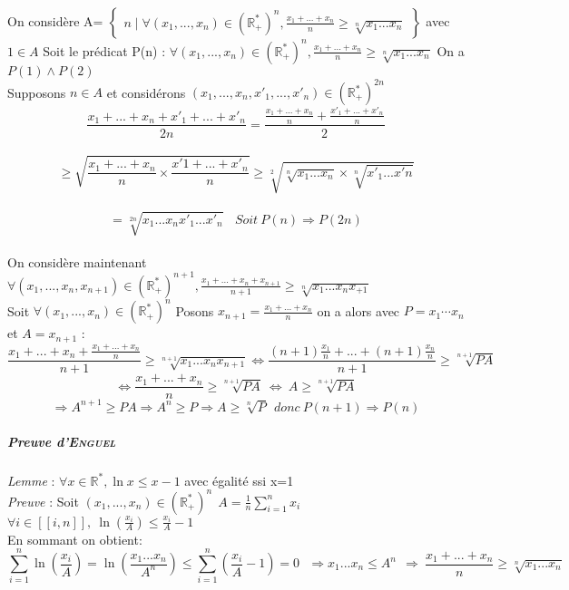 On considère A=
$\left\{
\begin{array}{l}
n\mid\forall (x_1,...,x_n)\in (\mathbb{R} _+^*)^n, \frac{x_1+...+x_n}{n}\geq\sqrt[n]{x_1...x_n}
\end{array}
\right\}$
 avec $1\in A$
Soit le prédicat P(n) : $\forall (x_1,...,x_n)\in (\mathbb{R} _+^*)^n, \frac{x_1+...+x_n}{n}\geq\sqrt[n]{x_1...x_n}$   On a $P(1)\wedge P(2)$
\\Supposons $n\in A$ et considérons $(x_1,...,x_n,x'_1,...,x'_n)\in (\mathbb{R} _+^*)^{2n}$
 \[\frac{x_1+...+x_n+x'_1+...+x'_n}{2n} =\frac{\frac{x_1+...+x_n}{n} + \frac{x'_1+...+x'_n}{n}}{2}\] \\\[\geq\sqrt{\frac{x_1+...+x_n}{n}\times\frac{x'1+...+x'_n}{n}}\geq\sqrt[2]{\sqrt[n]{x_1...x_n}\times\sqrt[n]{x'_1...x'n}}\] \\\[=\sqrt[2n]{x_1...x_nx'_1...x'_n} ~~~~Soit~P(n)\Rightarrow P(2n)\]
 \\On considère maintenant $\forall (x_1,...,x_n,x_{n+1})\in (\mathbb{R} _+^*)^{n+1}, \frac{x_1+...+x_n+x_{n+1}}{n+1}\geq\sqrt[n]{x_1...x_nx_{+1}}$
 \\Soit $\forall (x_1,...,x_n)\in (\mathbb{R} _+^*)^n$ Posons $x_{n+1}=\frac{x_1+...+x_n}{n}$ on a alors avec $P=x_1\cdots x_n$ et $A = x_{n+1}$ :
 \[\frac{x_1+...+x_n+\frac{x_1+...+x_n}{n}}{n+1}\geq\sqrt[n+1]{x_1...x_nx_{n+1}}
 \Leftrightarrow\frac{(n+1)\frac{x_1}{n} +...+(n+1)\frac{x_n}{n}}{n+1}\geq\sqrt[n+1]{PA}\]
 \[\Leftrightarrow\frac{x_1+...+x_n}{n}\geq\sqrt[n+1]{PA} ~\Leftrightarrow ~A\geq\sqrt[n+1]{PA}\]
 \[\Rightarrow A^{n+1}\geq PA \Rightarrow A^n\geq P\Rightarrow A\geq\sqrt[n]{P} ~~donc~P(n+1)\Rightarrow P(n)\]
 
\subparagraph{Preuve d'\textsc{Enguel}}
\textsl{Lemme} : $\forall x\in\mathbb{R} ^*, \ln x\leq x-1$ avec égalité ssi x=1
\\\textsl{Preuve} : Soit $(x_1,...,x_n)\in (\mathbb{R} _+^*)^n ~~A=\frac{1}{n} \sum\limits_{i=1}^nx_i$
$\forall i\in [\![i,n]\!] ,~\ln (\frac{x_i}{A})\leq\frac{x_i}{A} -1$
\\ En sommant on obtient:
\[\sum\limits_{i=1}^n\ln (\frac{x_i}{A}) = \ln (\frac{x_1...x_n}{A^n})\leq\sum\limits_{i=1}^n (\frac{x_i}{A} -1) = 0~~~
\Rightarrow x_1...x_n\leq A^n ~~\Rightarrow ~\frac{x_1+...+x_n}{n}\geq\sqrt[n]{x_1...x_n}\] \\ 
\begin{center}
\fin
\end{center}
